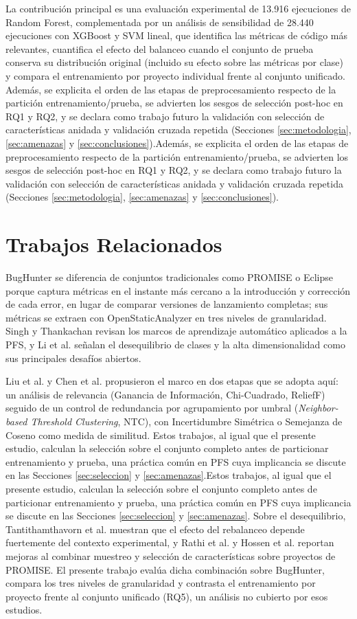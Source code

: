 \documentclass[conference,a4paper]{IEEEtran}
\newif\ifmarcarcambios
\newcommand{\cambio}[1]{\ifmarcarcambios\ifvmode\leavevmode\fi{\color{azulcambio}#1}\else#1\fi}
\begin{document}
La contribución principal es una evaluación experimental de 13.916 ejecuciones de Random Forest, complementada por un análisis de sensibilidad de 28.440 ejecuciones con XGBoost y SVM lineal, que identifica las métricas de código más relevantes, cuantifica el efecto del balanceo cuando el conjunto de prueba conserva su distribución original (incluido su efecto sobre las métricas por clase) y compara el entrenamiento por proyecto individual frente al conjunto unificado. \cambio{Además, se explicita el orden de las etapas de preprocesamiento respecto de la partición entrenamiento/prueba, se advierten los sesgos de selección post-hoc en RQ1 y RQ2, y se declara como trabajo futuro la validación con selección de características anidada y validación cruzada repetida (Secciones \ref{sec:metodologia}, \ref{sec:amenazas} y \ref{sec:conclusiones}).}

\section{Trabajos Relacionados}

BugHunter \cite{ferenc2020} se diferencia de conjuntos tradicionales como PROMISE o Eclipse \cite{promise2005} porque captura métricas en el instante más cercano a la introducción y corrección de cada error, en lugar de comparar versiones de lanzamiento completas; sus métricas se extraen con OpenStaticAnalyzer \cite{osa2004} en tres niveles de granularidad. Singh y Thankachan \cite{singh2021survey} revisan los marcos de aprendizaje automático aplicados a la PFS, y Li et al. \cite{li2018} señalan el desequilibrio de clases y la alta dimensionalidad como sus principales desafíos abiertos.

Liu et al. \cite{liu2015} y Chen et al. \cite{chen2013} propusieron el marco en dos etapas que se adopta aquí: un análisis de relevancia (Ganancia de Información, Chi-Cuadrado, ReliefF) seguido de un control de redundancia por agrupamiento por umbral (\textit{Neighbor-based Threshold Clustering}, NTC), con Incertidumbre Simétrica \cite{yu2003} o Semejanza de Coseno como medida de similitud. \cambio{Estos trabajos, al igual que el presente estudio, calculan la selección sobre el conjunto completo antes de particionar entrenamiento y prueba, una práctica común en PFS cuya implicancia se discute en las Secciones \ref{sec:seleccion} y \ref{sec:amenazas}.} Sobre el desequilibrio, Tantithamthavorn et al. \cite{tantithamthavorn2020} muestran que el efecto del rebalanceo depende fuertemente del contexto experimental, y Rathi et al. \cite{rathi2023} y Hossen et al. \cite{hossen2020} reportan mejoras al combinar muestreo y selección de características sobre proyectos de PROMISE. El presente trabajo evalúa dicha combinación sobre BugHunter, compara los tres niveles de granularidad y contrasta el entrenamiento por proyecto frente al conjunto unificado (RQ5), un análisis no cubierto por esos estudios.
\end{document}
